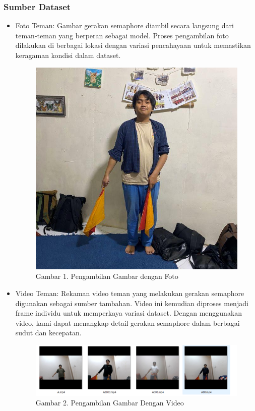 \documentclass[12pt,a4paper]{article}
\begin{document}
\subsubsection{Sumber Dataset}
\begin{itemize}
    \item Foto Teman: Gambar gerakan semaphore diambil secara langsung dari teman-teman yang berperan sebagai model. Proses pengambilan foto dilakukan di berbagai lokasi dengan variasi pencahayaan untuk memastikan keragaman kondisi dalam dataset.
    \begin{figure}[h]
        \centering
        \includegraphics[width=0.6\linewidth]{Images/Gambar1.jpg}
        \caption*{Gambar 1. Pengambilan Gambar dengan Foto}
        \label{fig:enter-label}
    \end{figure}
    \item Video Teman: Rekaman video teman yang melakukan gerakan semaphore digunakan sebagai sumber tambahan. Video ini kemudian diproses menjadi frame individu untuk memperkaya variasi dataset. Dengan menggunakan video, kami dapat menangkap detail gerakan semaphore dalam berbagai sudut dan kecepatan.
    \begin{figure}[h]
        \centering
        \includegraphics[width=0.9\linewidth]{Images/Gambar2.png}
        \caption*{Gambar 2. Pengambilan Gambar Dengan Video}
        \label{fig:enter-label}
    \end{figure}
\end{itemize}
\end{document}
